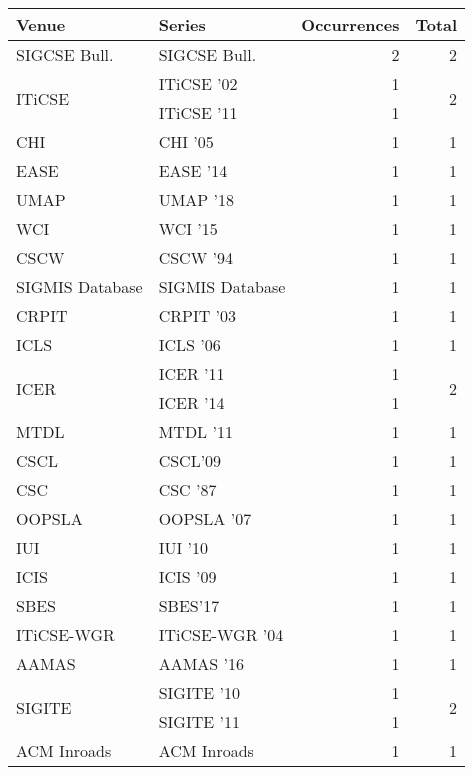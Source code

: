 \begin{table*}[t]
\begin{tabular}{llrr}
Venue & Series & Occurrences & Total\\\hline
\multirow{1}{*}{SIGCSE Bull.} & SIGCSE Bull. & 2 & \multirow{1}{*}{2}\\
\multirow{2}{*}{ITiCSE } & ITiCSE '02 & 1 & \multirow{2}{*}{2}\\
& ITiCSE '11 & 1 &\\
\multirow{1}{*}{CHI } & CHI '05 & 1 & \multirow{1}{*}{1}\\
\multirow{1}{*}{EASE } & EASE '14 & 1 & \multirow{1}{*}{1}\\
\multirow{1}{*}{UMAP } & UMAP '18 & 1 & \multirow{1}{*}{1}\\
\multirow{1}{*}{WCI } & WCI '15 & 1 & \multirow{1}{*}{1}\\
\multirow{1}{*}{CSCW } & CSCW '94 & 1 & \multirow{1}{*}{1}\\
\multirow{1}{*}{SIGMIS Database} & SIGMIS Database & 1 & \multirow{1}{*}{1}\\
\multirow{1}{*}{CRPIT } & CRPIT '03 & 1 & \multirow{1}{*}{1}\\
\multirow{1}{*}{ICLS } & ICLS '06 & 1 & \multirow{1}{*}{1}\\
\multirow{2}{*}{ICER } & ICER '11 & 1 & \multirow{2}{*}{2}\\
& ICER '14 & 1 &\\
\multirow{1}{*}{MTDL } & MTDL '11 & 1 & \multirow{1}{*}{1}\\
\multirow{1}{*}{CSCL} & CSCL'09 & 1 & \multirow{1}{*}{1}\\
\multirow{1}{*}{CSC } & CSC '87 & 1 & \multirow{1}{*}{1}\\
\multirow{1}{*}{OOPSLA } & OOPSLA '07 & 1 & \multirow{1}{*}{1}\\
\multirow{1}{*}{IUI } & IUI '10 & 1 & \multirow{1}{*}{1}\\
\multirow{1}{*}{ICIS } & ICIS '09 & 1 & \multirow{1}{*}{1}\\
\multirow{1}{*}{SBES} & SBES'17 & 1 & \multirow{1}{*}{1}\\
\multirow{1}{*}{ITiCSE-WGR } & ITiCSE-WGR '04 & 1 & \multirow{1}{*}{1}\\
\multirow{1}{*}{AAMAS } & AAMAS '16 & 1 & \multirow{1}{*}{1}\\
\multirow{2}{*}{SIGITE } & SIGITE '10 & 1 & \multirow{2}{*}{2}\\
& SIGITE '11 & 1 &\\
\multirow{1}{*}{ACM Inroads} & ACM Inroads & 1 & \multirow{1}{*}{1}\\

\end{tabular}
\end{table*}
